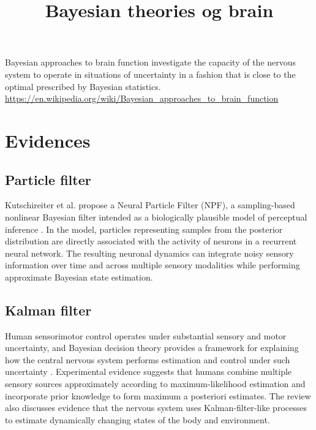 \documentclass[a4paper]{article}
\title{Bayesian theories og brain}
\date{}
\begin{document}
   \maketitle
   Bayesian approaches to brain function investigate the capacity of the nervous system to operate in situations of uncertainty in a fashion that is close to the optimal prescribed by Bayesian statistics. \url{https://en.wikipedia.org/wiki/Bayesian_approaches_to_brain_function}
   \section{Evidences}
      \subsection{Particle filter}
         Kutschireiter et al. propose a Neural Particle Filter (NPF), a sampling-based nonlinear Bayesian filter intended as a biologically plausible model of perceptual inference \cite{kutschireiter-2017-nonlinear-bayesian-filtering-and-learning-a-neuronal-dynamics-for-perception}.
         In the model, particles representing samples from the posterior distribution are directly associated with the activity of neurons in a recurrent neural network.
         The resulting neuronal dynamics can integrate noisy sensory information over time and across multiple sensory modalities while performing approximate Bayesian state estimation.


      \subsection{Kalman filter}
         Human sensorimotor control operates under substantial sensory and motor uncertainty, and Bayesian decision theory provides a framework for explaining how the central nervous system performs estimation and control under such uncertainty \cite{wolpert-2007-probabilistic-models-in-human-sensorimotor-control}. Experimental evidence suggests that humans combine multiple sensory sources approximately according to maximum-likelihood estimation and incorporate prior knowledge to form maximum a posteriori estimates.
         The review also discusses evidence that the nervous system uses Kalman-filter-like processes to estimate dynamically changing states of the body and environment.

\end{document}

